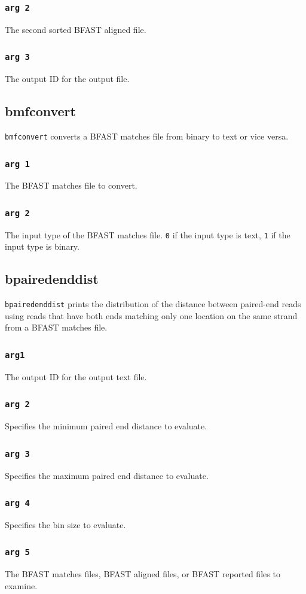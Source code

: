\documentclass[a4paper,12pt]{book}
\newcommand{\TT}[1]{{\tt #1}} %
\newcommand{\BMF}{BFAST matches file} %
\newcommand{\BAF}{BFAST aligned file} %
\newcommand{\BRF}{BFAST reported file} %
\begin{document}
\subsubsection{\TT{arg 2}}
The second sorted \BAF{}.
\subsubsection{\TT{arg 3}}
The output ID for the output file.

\subsection{bmfconvert}
\label{sec:bmfconvert}
\TT{bmfconvert} converts a \BMF{} from binary to text or vice versa.
\subsubsection{\TT{arg 1}}
The \BMF{} to convert.
\subsubsection{\TT{arg 2}}
The input type of the \BMF{}. 
\TT{0} if the input type is text, \TT{1} if the input type is binary.
\subsection{bpairedenddist}
\label{sec:bpairedenddist}
\TT{bpairedenddist} prints the distribution of the distance between paired-end reads using reads that have both ends matching only one location on the same strand from a \BMF{}.
\subsubsection{\TT{arg1}}
The output ID for the output text file.
\subsubsection{\TT{arg 2}}
Specifies the minimum paired end distance to evaluate.
\subsubsection{\TT{arg 3}}
Specifies the maximum paired end distance to evaluate.
\subsubsection{\TT{arg 4}}
Specifies the bin size to evaluate.
\subsubsection{\TT{arg 5}}
The \BMF{s}, \BAF{s}, or \BRF{s} to examine.
\end{document}
